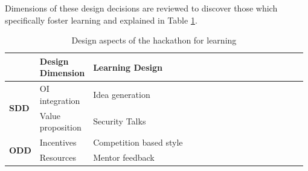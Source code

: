 Dimensions of these design decisions are reviewed to discover those which specifically foster learning and explained in Table \ref{tab:designaspectforlearn}. 


\begin{table}[h]
\caption{Design aspects of the hackathon for learning}
    \label{tab:designaspectforlearn}
\begin{tabular}{|p{0.08\linewidth}|p{0.14\linewidth}|p{0.76\linewidth}|} \hline	
    & Design Dimension & Learning Design  \\ \hline
	\multirow{2}{*}{\textbf{SDD}} & OI \newline integration & Idea generation \\ \cline{2-3}
    & Value \newline proposition & Security Talks \\ \hline
	\multirow{2}{*}{\textbf{ODD}} & Incentives & Competition based style  \\ \cline{2-3}
	& Resources & Mentor feedback \\ \cline{2-3} \hline
\end{tabular}
\end{table}

